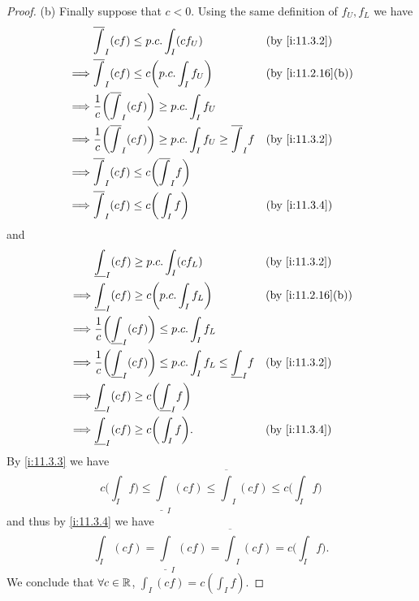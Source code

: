 \begin{proof}{(b)}
  Finally suppose that \(c < 0\).
  Using the same definition of \(f_U, f_L\) we have
  \begin{align*}
             & \overline{\int}_I (cf) \leq p.c. \int_I (c f_U)                                               &  & \by{i:11.3.2}     \\
    \implies & \overline{\int}_I (cf) \leq c \bigg(p.c. \int_I f_U\bigg)                                     &  & \by{i:11.2.16}[b] \\
    \implies & \dfrac{1}{c} \bigg(\overline{\int}_I (cf)\bigg) \geq p.c. \int_I f_U                                                 \\
    \implies & \dfrac{1}{c} \bigg(\overline{\int}_I (cf)\bigg) \geq p.c. \int_I f_U \geq \overline{\int}_I f &  & \by{i:11.3.2}     \\
    \implies & \overline{\int}_I (cf) \leq c\bigg(\overline{\int}_I f\bigg)                                                         \\
    \implies & \overline{\int}_I (cf) \leq c\bigg(\int_I f\bigg)                                             &  & \by{i:11.3.4}
  \end{align*}
  and
  \begin{align*}
             & \underline{\int}_I (cf) \geq p.c. \int_I (c f_L)                                                &  & \by{i:11.3.2}     \\
    \implies & \underline{\int}_I (cf) \geq c \bigg(p.c. \int_I f_L\bigg)                                      &  & \by{i:11.2.16}[b] \\
    \implies & \dfrac{1}{c} \bigg(\underline{\int}_I (cf)\bigg) \leq p.c. \int_I f_L                                                  \\
    \implies & \dfrac{1}{c} \bigg(\underline{\int}_I (cf)\bigg) \leq p.c. \int_I f_L \leq \underline{\int}_I f &  & \by{i:11.3.2}     \\
    \implies & \underline{\int}_I (cf) \geq c\bigg(\underline{\int}_I f\bigg)                                                         \\
    \implies & \underline{\int}_I (cf) \geq c\bigg(\int_I f\bigg).                                             &  & \by{i:11.3.4}
  \end{align*}
  By \cref{i:11.3.3} we have
  \[
    c\bigg(\int_I f\bigg) \leq \underline{\int}_I (cf) \leq \overline{\int}_I (cf) \leq c\bigg(\int_I f\bigg)
  \]
  and thus by \cref{i:11.3.4} we have
  \[
    \int_I (cf) = \underline{\int}_I (cf) = \overline{\int}_I (cf) = c\bigg(\int_I f\bigg).
  \]
  We conclude that \(\forall c \in \mathbb{R}\), \(\int_I (cf) = c (\int_I f)\).
\end{proof}

